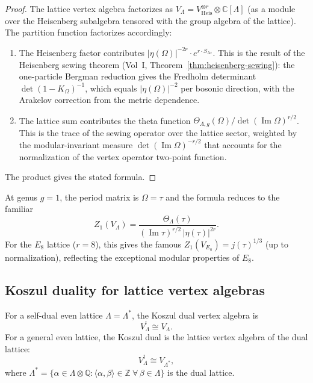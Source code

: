 \begin{proof}
The lattice vertex algebra factorizes as
$V_\Lambda = V_{\mathrm{Heis}}^{\otimes r} \otimes \mathbb{C}[\Lambda]$
(as a module over the Heisenberg subalgebra tensored with the group
algebra of the lattice). The partition function factorizes accordingly:
\begin{enumerate}[leftmargin=2.4em]
\item The Heisenberg factor contributes
$|\eta(\Omega)|^{-2r} \cdot e^{r \cdot S_{\mathrm{Ar}}}$.
This is the result of the Heisenberg sewing theorem
(Vol~I, Theorem~\ref*{thm:heisenberg-sewing}):
the one-particle Bergman reduction gives the Fredholm determinant
$\det(1 - K_\Omega)^{-1}$, which equals $|\eta(\Omega)|^{-2}$ per
bosonic direction, with the Arakelov correction from the metric
dependence.

\item The lattice sum contributes the theta function
$\Theta_{\Lambda,g}(\Omega) / \det(\operatorname{Im}\Omega)^{r/2}$.
This is the trace of the sewing operator over the lattice sector,
weighted by the modular-invariant measure
$\det(\operatorname{Im}\Omega)^{-r/2}$ that accounts for the
normalization of the vertex operator two-point function.
\end{enumerate}
The product gives the stated formula.
\end{proof}

\begin{remark}
At genus $g=1$, the period matrix is $\Omega = \tau$ and the formula
reduces to the familiar
\[
Z_1(V_\Lambda)
=
\frac{\Theta_\Lambda(\tau)}{(\operatorname{Im}\tau)^{r/2}\,|\eta(\tau)|^{2r}}.
\]
For the $E_8$ lattice ($r=8$), this gives the famous
$Z_1(V_{E_8}) = j(\tau)^{1/3}$ (up to normalization), reflecting the
exceptional modular properties of $E_8$.
\end{remark}

\subsection{Koszul duality for lattice vertex algebras}

\begin{theorem}
For a self-dual even lattice $\Lambda = \Lambda^*$, the Koszul dual
vertex algebra is
\[
V_\Lambda^! \cong V_\Lambda.
\]
For a general even lattice, the Koszul dual is the lattice vertex algebra
of the dual lattice:
\[
V_\Lambda^! \cong V_{\Lambda^*},
\]
where $\Lambda^* = \{\alpha \in \Lambda \otimes \mathbb{Q} :
\langle\alpha,\beta\rangle \in \mathbb{Z}\ \forall\,\beta\in\Lambda\}$
is the dual lattice.
\end{theorem}

